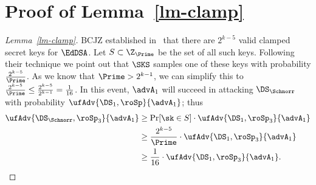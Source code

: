 \section{Proof of Lemma~\ref{lm-clamp}} \label{sec-lem7}
\begin{proof}[Lemma~\ref{lm-clamp}] 
	BCJZ established in~\cite{SP:BCJZ21} that there are $2^{k-5}$ valid clamped secret keys for $\EdDSA$.
	Let $S\subset \Z_{\Prime}$ be the set of all such keys.
	Following their technique we point out that $\SKS$ samples one of these keys with probability $\frac{2^{k-5}}{\Prime}$.
	As we know that $\Prime > 2^{k-1}$, we can simplify this to $\frac{2^{k-5}}{\Prime} \leq \frac{2^{k-5}}{2^{k-1}} = \frac{1}{16}$.
	In this event, $\advA_1$ will succeed in attacking $\DS_{\Schnorr}$ with probability $\ufAdv{\DS_1, \roSp}{\advA_1}$; thus
	\begin{align*}
		\ufAdv{\DS_{\Schnorr}, \roSp_3}{\advA_1} &\geq \Pr[\sk \in S] \cdot \ufAdv{\DS_1, \roSp_3}{\advA_1}\\
		&\geq  \frac{2^{k-5}}{\Prime}  \cdot  \ufAdv{\DS_1, \roSp_3}{\advA_1}\\
		& \geq \frac{1}{16}  \cdot  \ufAdv{\DS_1, \roSp_3}{\advA_1}.
	\end{align*}
\end{proof}